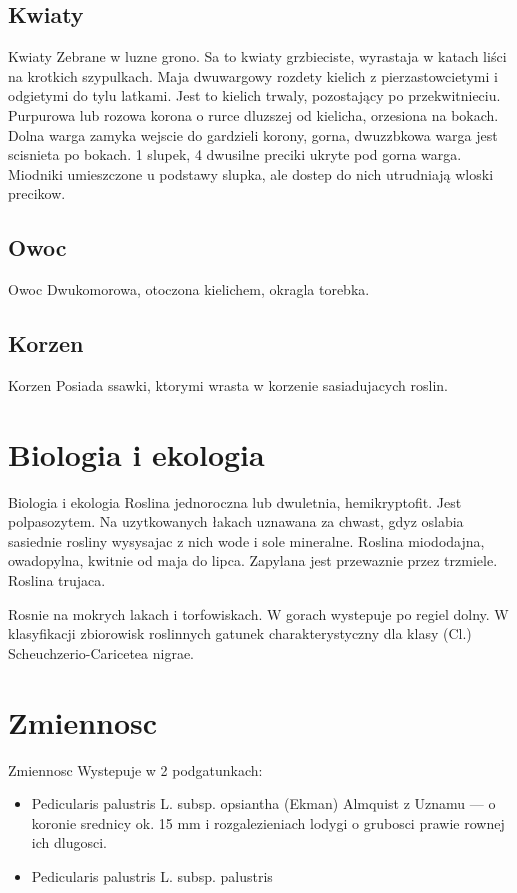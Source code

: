\documentclass{beamer}
\begin{document}
\subsection{Kwiaty}
\begin{frame}{Kwiaty}
Zebrane w luzne grono. Sa to kwiaty grzbieciste, wyrastaja w katach liści na krotkich szypulkach. Maja dwuwargowy rozdety kielich z pierzastowcietymi i odgietymi do tylu latkami. Jest to kielich trwaly, pozostający po przekwitnieciu. Purpurowa lub rozowa korona o rurce dluzszej od kielicha, orzesiona na bokach. Dolna warga zamyka wejscie do gardzieli korony, gorna, dwuzzbkowa warga jest scisnieta po bokach. 1 slupek, 4 dwusilne preciki ukryte pod gorna warga. Miodniki umieszczone u podstawy slupka, ale dostep do nich utrudniają wloski precikow.
\end{frame}

\subsection{Owoc}
\begin{frame}{Owoc}
Dwukomorowa, otoczona kielichem, okragla torebka.
\end{frame}

\subsection{Korzen}
\begin{frame}{Korzen}
Posiada ssawki, ktorymi wrasta w korzenie sasiadujacych roslin.
\end{frame}

\section{Biologia i ekologia}
\begin{frame}{Biologia i ekologia}
Roslina jednoroczna lub dwuletnia, hemikryptofit. Jest polpasozytem. Na uzytkowanych łakach uznawana za chwast, gdyz oslabia sasiednie rosliny wysysajac z nich wode i sole mineralne. Roslina miododajna, owadopylna, kwitnie od maja do lipca. Zapylana jest przewaznie przez trzmiele. Roslina trujaca.

Rosnie na mokrych lakach i torfowiskach. W gorach wystepuje po regiel dolny. W klasyfikacji zbiorowisk roslinnych gatunek charakterystyczny dla klasy (Cl.) Scheuchzerio-Caricetea nigrae.
\end{frame}

\section{Zmiennosc}
\begin{frame}{Zmiennosc}
Wystepuje w 2 podgatunkach:
\begin{itemize}
\item Pedicularis palustris L. subsp. opsiantha (Ekman) Almquist z Uznamu --- o koronie srednicy ok. 15 mm i rozgalezieniach lodygi o grubosci prawie rownej ich dlugosci.

\item Pedicularis palustris L. subsp. palustris
\end{itemize}
\end{frame}
\end{document}
